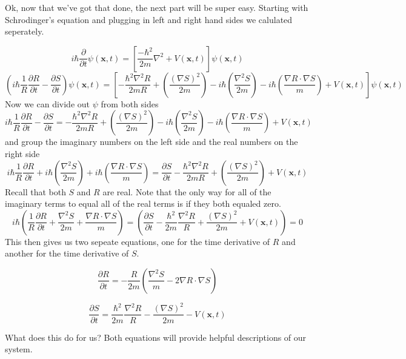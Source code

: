 Ok, now that we've got that done, the next part will be super easy. Starting with Schrodinger's equation and plugging in left and right hand sides we calulated seperately. 

$$
i\hbar\frac{\partial}{\partial t} \psi(\mathbf{x},t) = \left [ \frac{-\hbar^2}{2 m}\nabla^2 + V(\mathbf{x},t)\right ] \psi(\mathbf{x},t)
$$
$$
\left(i \hbar \frac{1}{R} \frac{\partial R}{\partial t} - \frac{\partial S}{\partial t}\right) \psi(\mathbf{x},t) =\left [-\frac{\hbar^2  \nabla^2 R}{2 m R} + \left(\frac{(\nabla S)^2}{2 m}\right)  - i \hbar \left(\frac{\nabla^2 S}{2 m}\right) - i \hbar \left(\frac{\nabla R \cdot \nabla S}{m}\right) + V(\mathbf{x},t) \right]\psi(\mathbf{x},t) 
$$
Now we can divide out $\psi$ from both sides
$$ 
i \hbar \frac{1}{R} \frac{\partial R}{\partial t} - \frac{\partial S}{\partial t} = -\frac{\hbar^2  \nabla^2 R}{2 m R} + \left(\frac{(\nabla S)^2}{2 m}\right)  - i \hbar \left(\frac{\nabla^2 S}{2 m}\right) - i \hbar \left(\frac{\nabla R \cdot \nabla S}{m}\right) + V(\mathbf{x},t)
$$
and group the imaginary numbers on the left side and the real numbers on the right side 
$$ i \hbar \frac{1}{R} \frac{\partial R}{\partial t} + i \hbar \left(\frac{\nabla^2 S}{2 m}\right) + i \hbar \left(\frac{\nabla R \cdot \nabla S}{m}\right) = \frac{\partial S}{\partial t} -\frac{\hbar^2  \nabla^2 R}{2 m R} + \left(\frac{(\nabla S)^2}{2 m}\right)  + V(\mathbf{x},t)
$$
Recall that both $S$ and $R$ are real. Note that the only way for all of the imaginary terms to equal all of the real terms is if they both equaled zero.
$$i \hbar \left(\frac{1}{R} \frac{\partial R}{\partial t} + \frac{\nabla^2 S}{2 m} + \frac{\nabla R \cdot \nabla S}{m}\right) = \left(\frac{\partial S}{\partial t} -\frac{\hbar^2}{2m}\frac{\nabla^2 R}{R} + \frac{(\nabla S)^2}{2 m}  + V(\mathbf{x},t) \right) = 0
$$
This then gives us two sepeate equations, one for the time derivative of $R$ and another for the time derivative of $S$.

\begin{equation}
\label{dR/dt}
\frac{\partial R}{\partial t} = -\frac{R}{2 m}\left(\frac{\nabla^2 S}{m}-2\nabla R \cdot \nabla S\right)
\end{equation}


\begin{equation}
\label{dS/dt}
\frac{\partial S}{\partial t} = \frac{\hbar^2}{2m}\frac{\nabla^2 R}{R} - \frac{(\nabla S)^2}{2 m} - V(\mathbf{x},t)
\end{equation}

What does this do for us? Both equations will provide helpful descriptions of our system.


